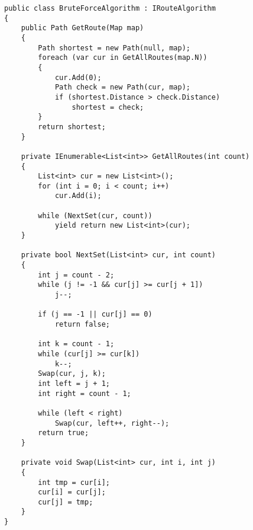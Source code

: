        \begin{lstlisting}[language={[Sharp]C}, label=lst:brute-force, caption=Реализация алгоритма поиска полным перебором]
public class BruteForceAlgorithm : IRouteAlgorithm
{
    public Path GetRoute(Map map)
    {
        Path shortest = new Path(null, map);
        foreach (var cur in GetAllRoutes(map.N))
        {
            cur.Add(0);
            Path check = new Path(cur, map);
            if (shortest.Distance > check.Distance)
                shortest = check;
        }
        return shortest;
    }

    private IEnumerable<List<int>> GetAllRoutes(int count)
    {
        List<int> cur = new List<int>();
        for (int i = 0; i < count; i++)
            cur.Add(i);

        while (NextSet(cur, count))
            yield return new List<int>(cur);
    }

    private bool NextSet(List<int> cur, int count)
    {
        int j = count - 2;
        while (j != -1 && cur[j] >= cur[j + 1]) 
            j--;

        if (j == -1 || cur[j] == 0)
            return false;

        int k = count - 1;
        while (cur[j] >= cur[k])
            k--;
        Swap(cur, j, k);
        int left = j + 1;
        int right = count - 1;

        while (left < right)
            Swap(cur, left++, right--);
        return true;
    }

    private void Swap(List<int> cur, int i, int j)
    {
        int tmp = cur[i];
        cur[i] = cur[j];
        cur[j] = tmp;
    }
}
        \end{lstlisting}

